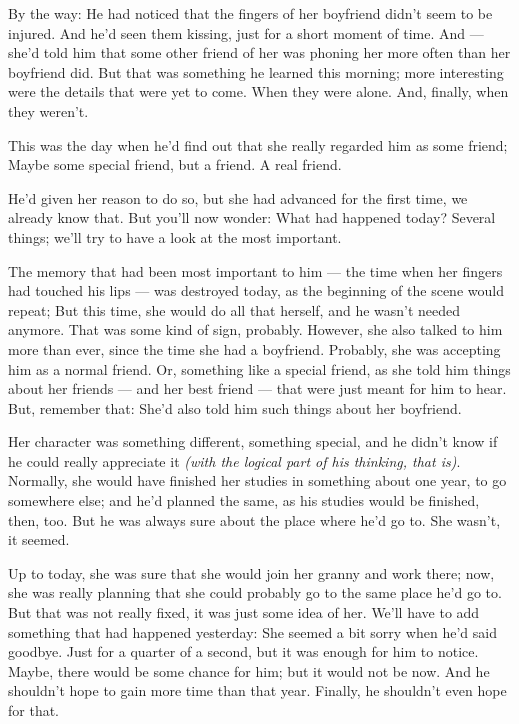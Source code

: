 By the way: He had noticed that the fingers of her boyfriend didn't seem to be injured. And he'd seen them kissing, just for a short moment of time. 
And --- she'd told him that some other friend of her was phoning her more often than her boyfriend did. 
But that was something he learned this morning; more interesting were the details that were yet to come. 
When they were alone. 
And, finally, when they weren't.

This was the day when he'd find out that she really regarded him as some friend; Maybe some special friend, but a friend. 
A real friend.

He'd given her reason to do so, but she had advanced for the first time, we already know that. 
But you'll now wonder: What had happened today?
Several things; we'll try to have a look at the most important.

The memory that had been most important to him --- the time when her fingers had touched his lips --- was destroyed today, as the beginning of the scene would repeat; But this time, she would do all that herself, and he wasn't needed anymore. 
That was some kind of sign, probably. 
However, she also talked to him more than ever, since the time she had a boyfriend. 
Probably, she was accepting him as a normal friend. 
Or, something like a special friend, as she told him things about her friends --- and her best friend --- that were just meant for him to hear.
But, remember that: She'd also told him such things about her boyfriend.

Her character was something different, something special, and he didn't know if he could really appreciate it \emph{(with the logical part of his thinking, that is)}. 
Normally, she would have finished her studies in something about one year, to go somewhere else; and he'd planned the same, as his studies would be finished, then, too. 
But he was always sure about the place where he'd go to. 
She wasn't, it seemed.

Up to today, she was sure that she would join her granny and work there; now, she was really planning that she could probably go to the same place he'd go to. 
But that was not really fixed, it was just some idea of her. 
We'll have to add something that had happened yesterday: She seemed a bit sorry when he'd said goodbye. 
Just for a quarter of a second, but it was enough for him to notice. 
Maybe, there would be some chance for him; but it would not be now. 
And he shouldn't hope to gain more time than that year. 
Finally, he shouldn't even hope for that.


